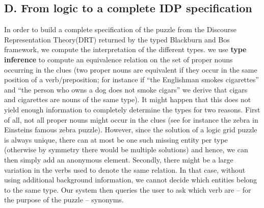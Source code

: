 \subsection{D. From logic to a complete IDP specification} 
In order to build a complete specification of the puzzle from the Discourse Representation Theory(DRT) returned by the typed Blackburn and Bos framework, we compute the interpretation of the different types. 
we  use \textbf{type inference} to compute an equivalence relation on the set of proper nouns occurring in the clues (two proper nouns are equivalent if they occur in the same position of a verb/preposition; for instance if ``the Englishman smokes cigarettes'' and ``the person who owns a dog does not smoke cigars'' we derive that cigars and cigarettes are nouns of the same type). It might happen that this does not yield enough information to completely determine the types for two reasons. 
First of all, not all proper nouns might occur in the clues (see for instance the zebra in Einsteins famous zebra puzzle). 
However, since the solution of a logic grid puzzle is always unique, there can at most be one such missing entity per type (otherwise by symmetry there would be multiple solutions) and hence, we can then simply add an anonymous element. 
Secondly, there might be a large variation in the verbs used to denote the same relation. In that case, without using additional background information, we cannot decide which entities belong to the same type. Our system then queries the user to ask which verb are -- for the purpose of the puzzle -- synonyms. 

